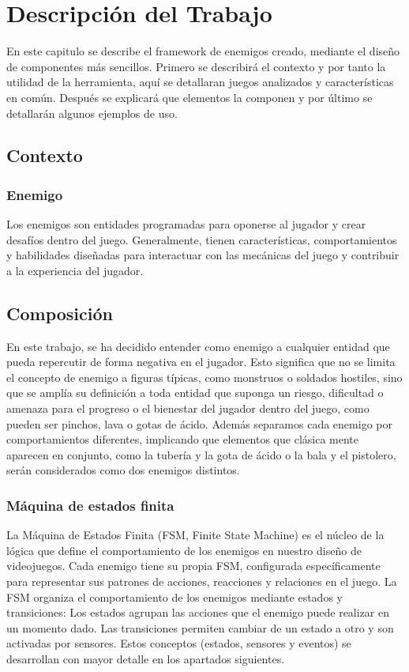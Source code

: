 \chapter{Descripción del Trabajo}
\label{cap:descripcionTrabajo}
En este capitulo se describe el framework de enemigos creado, mediante el diseño de componentes más sencillos. 
Primero se describirá el contexto y por tanto la utilidad de la herramienta, aquí se detallaran juegos analizados y características en común. Después se explicará que elementos la componen y por último se detallarán algunos ejemplos de uso. \\
\section{Contexto}
\subsection{Enemigo}
Los enemigos son entidades programadas para oponerse al jugador y crear desafíos dentro del juego. Generalmente, tienen características, comportamientos y habilidades diseñadas para interactuar con las mecánicas del juego y contribuir a la experiencia del jugador. \\

\section{Composición}
En este trabajo, se ha decidido entender como enemigo a cualquier entidad que pueda repercutir de forma negativa en el jugador. Esto significa que no se limita el concepto de enemigo a figuras típicas, como monstruos o soldados hostiles, sino que se amplía su definición a toda entidad que suponga un riesgo, dificultad o amenaza para el progreso o el bienestar del jugador dentro del juego, como pueden ser pinchos, lava o gotas de ácido.
Además separamos cada enemigo por comportamientos diferentes, implicando que elementos que clásica mente aparecen en conjunto, como la tubería y la gota de ácido o la bala y el pistolero, serán considerados como  dos enemigos distintos.\\

\subsection{Máquina de estados finita}

La Máquina de Estados Finita (FSM, Finite State Machine) es el núcleo de la lógica que define el comportamiento de los enemigos en nuestro diseño de videojuegos. Cada enemigo tiene su propia FSM, configurada específicamente para representar sus patrones de acciones, reacciones y relaciones en el juego. La FSM organiza el comportamiento de los enemigos mediante estados y transiciones:
Los estados agrupan las acciones que el enemigo puede realizar en un momento dado.
Las transiciones permiten cambiar de un estado a otro y son activadas por sensores.
Estos conceptos (estados, sensores y eventos) se desarrollan con mayor detalle en los apartados siguientes.

